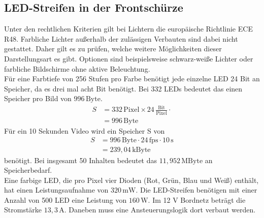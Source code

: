 \subsection{LED-Streifen in der Frontschürze}
Unter den rechtlichen Kriterien gilt bei Lichtern die europäische Richtlinie ECE R48. Farbliche Lichter außerhalb der zulässigen Verbauten sind dabei nicht gestattet. Daher gilt es zu prüfen, welche weitere Möglichkeiten dieser Darstellungsart es gibt. Optionen sind beispielsweise schwarz-weiße Lichter oder farbliche Bildschirme ohne aktive Beleuchtung. \\
Für eine Farbtiefe von 256 Stufen pro Farbe benötigt jede einzelne LED 24 Bit an Speicher, da es drei mal acht Bit benötigt. Bei 332 LEDs bedeutet das einen Speicher pro Bild von $ 996\,\mathrm{Byte} $.
\begin{align}
	S &= 332\,\mathrm{Pixel} \times 24\,\frac{\mathrm{Bit}}{\mathrm{Pixel}} \cdot \\
	&=  996\,\mathrm{Byte}
\end{align}
Für ein 10 Sekunden Video wird ein Speicher S von 
\begin{align}
	S &= 996\,\mathrm{Byte} \cdot 24\,\mathrm{fps} \cdot 10\,\mathrm{s}\\
	&= 239,04\,\mathrm{kByte}
\end{align}
benötigt. Bei insgesamt 50 Inhalten bedeutet das $ 11,952\,\mathrm{MByte} $ an Speicherbedarf. \\
Eine farbige LED, die pro Pixel vier Dioden (Rot, Grün, Blau und Weiß) enthält, hat einen Leistungsaufnahme von $ 320\,\mathrm{mW} $.  
Die LED-Streifen benötigen mit einer Anzahl von 500 LED eine Leistung von $ 160\,\mathrm{W} $. Im 12 V Bordnetz beträgt die Stromstärke $ 13,3\,\mathrm{A} $. 
Daneben muss eine Ansteuerungslogik dort verbaut werden.
